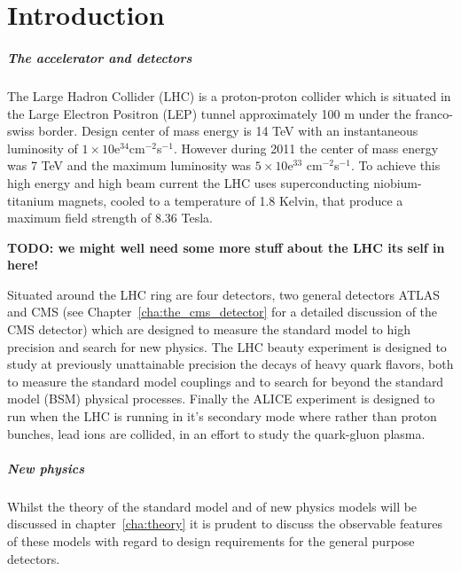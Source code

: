 \chapter{Introduction} %
\label{cha:introduction}
\paragraph{The accelerator and detectors} %
\label{par:the_accelerator_and_detectors}
The Large Hadron Collider (LHC) \cite{Benedikt:823808} is a proton-proton collider which is situated in the Large Electron Positron
(LEP) tunnel approximately 100 m under the franco-swiss border. Design center of mass energy is 14 TeV with an instantaneous
luminosity of $ 1 \times 10$e$^{34}$cm$^{-2}$s$^{-1}$. However during 2011 the center of mass energy was 7 TeV and the maximum
luminosity was $ 5 \times 10$e$^{33}$ cm$^{-2}$s$^{-1}$.
To achieve this high energy and high beam current the LHC uses superconducting niobium-titanium magnets, cooled to a temperature of 
1.8 Kelvin, that produce a maximum field strength of 8.36 Tesla.

\textbf{TODO: we might well need some more stuff about the LHC its self in here!}

Situated around the LHC ring are four detectors, two general detectors ATLAS \cite{Akesson:1999uv} and CMS (see
Chapter~\ref{cha:the_cms_detector} for a detailed discussion of the CMS detector) \cite{Friedl:1140134}\cite{Wulz:vf} which are  designed to measure the standard model to high precision and search for new physics. The LHC beauty experiment 
\cite{Rademacker:2005tx} is designed to study at previously unattainable precision the decays of heavy quark 
flavors, both to measure the standard model couplings and to search for beyond the standard model (BSM) physical processes. Finally
the ALICE \cite{Alessandro:2006ht} experiment is designed to run when the LHC is running in it's secondary mode where rather than
proton bunches, lead ions are collided, in an effort to study the quark-gluon plasma.




\paragraph{New physics} %
\label{par:new_physics}
Whilst the theory of the standard model and of new physics models will be discussed in chapter~\ref{cha:theory} it is prudent to 
discuss the observable features of these models with regard to design requirements for the general purpose detectors.

